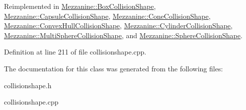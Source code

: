 Reimplemented in \hyperlink{classMezzanine_1_1BoxCollisionShape_aa96e3055ec21f18198bceccdeaafa538}{Mezzanine::BoxCollisionShape}, \hyperlink{classMezzanine_1_1CapsuleCollisionShape_a6225978757c6b80f590336cb04f9ebf5}{Mezzanine::CapsuleCollisionShape}, \hyperlink{classMezzanine_1_1ConeCollisionShape_a41c55ca94878cb62836540b871457d77}{Mezzanine::ConeCollisionShape}, \hyperlink{classMezzanine_1_1ConvexHullCollisionShape_a58cda94bb88fd44976747e0600b2356f}{Mezzanine::ConvexHullCollisionShape}, \hyperlink{classMezzanine_1_1CylinderCollisionShape_a7fa7200a26ab2788416c729e28ed6688}{Mezzanine::CylinderCollisionShape}, \hyperlink{classMezzanine_1_1MultiSphereCollisionShape_a5b64cbb0b59708f6e3d21ab6b9894afa}{Mezzanine::MultiSphereCollisionShape}, and \hyperlink{classMezzanine_1_1SphereCollisionShape_a41c14d2a29a4ed2f0d5fe6fd386ab71e}{Mezzanine::SphereCollisionShape}.



Definition at line 211 of file collisionshape.cpp.



The documentation for this class was generated from the following files:\begin{DoxyCompactItemize}
\item 
collisionshape.h\item 
collisionshape.cpp\end{DoxyCompactItemize}
